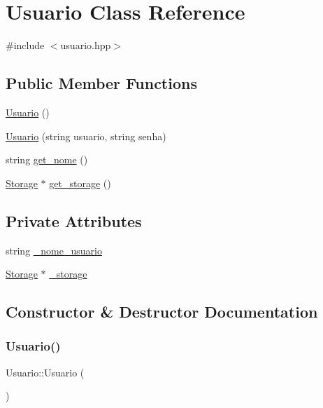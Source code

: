\hypertarget{classUsuario}{}\section{Usuario Class Reference}
\label{classUsuario}


{\ttfamily \#include $<$usuario.\+hpp$>$}

\subsection*{Public Member Functions}
\begin{DoxyCompactItemize}
\item 
\hyperlink{classUsuario_aa85a5371a098dfba5449140d9b8a472f}{Usuario} ()
\item 
\hyperlink{classUsuario_a0cde516a7cd7901bd255c0d5552b67cb}{Usuario} (string usuario, string senha)
\item 
string \hyperlink{classUsuario_a65e8e43842bcaa429a4f971b2b950e2c}{get\+\_\+nome} ()
\item 
\hyperlink{classStorage}{Storage} $\ast$ \hyperlink{classUsuario_a29f0b4619fc682fdfa3f53c7488b3a33}{get\+\_\+storage} ()
\end{DoxyCompactItemize}
\subsection*{Private Attributes}
\begin{DoxyCompactItemize}
\item 
string \hyperlink{classUsuario_a1f8c614f94b3ac85915bf27aedd86ffb}{\+\_\+nome\+\_\+usuario}
\item 
\hyperlink{classStorage}{Storage} $\ast$ \hyperlink{classUsuario_ab513a33701fd16851c1307906913bf10}{\+\_\+storage}
\end{DoxyCompactItemize}


\subsection{Constructor \& Destructor Documentation}
\mbox{\label{classUsuario_aa85a5371a098dfba5449140d9b8a472f}} 
\subsubsection{\texorpdfstring{Usuario()}{Usuario()}\hspace{0.1cm}{\footnotesize\ttfamily [1/2]}}
{\footnotesize\ttfamily Usuario\+::\+Usuario (\begin{DoxyParamCaption}{ }\end{DoxyParamCaption})}


